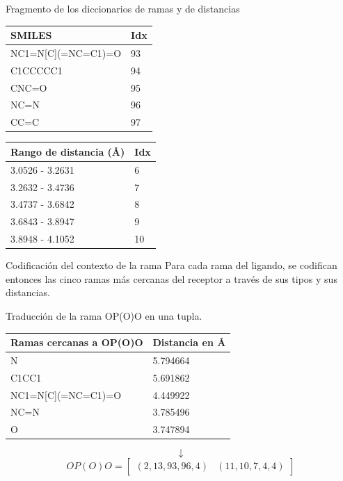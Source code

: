 \documentclass[presentation]{beamer}
\begin{document}
\begin{frame}[label={sec:orgaa8eb44}]{Fragmento de los diccionarios de ramas y de distancias}
\begin{table}[H]
  \begin{center}
    \begin{tabular}{l|l}
      SMILES                 & Idx \\ \hline
      NC1=N{[}C{]}(=NC=C1)=O & 93 \\
      C1CCCCC1               & 94 \\
      CNC=O                  & 95 \\
      NC=N                   & 96 \\
      CC=C                   & 97
    \end{tabular}
    \begin{tabular}{l|l}
      Rango de distancia (\AA) & Idx \\ \hline
      3.0526 - 3.2631        & 6   \\
      3.2632 - 3.4736        & 7   \\
      3.4737 - 3.6842        & 8   \\
      3.6843 - 3.8947        & 9   \\
      3.8948 - 4.1052        & 10
    \end{tabular}
  \end{center}
\end{table}
\end{frame}
\begin{frame}[label={sec:orgc2f7152}]{Codificación del contexto de la rama}
Para cada rama del ligando, se codifican entonces las cinco
ramas más cercanas del receptor a través de sus tipos y sus distancias.
\pause
\begin{block}{Traducción de la rama \alert{OP(O)O} en una tupla.}
\pause
\begin{table}[H]
  \begin{center}
  \begin{tabular}{l|l}
    Ramas cercanas a OP(O)O & Distancia en \AA \\ \hline N & 5.794664 \\ C1CC1 & 5.691862
    \\ NC1=N{[}C{]}(=NC=C1)=O & 4.449922 \\ NC=N & 3.785496 \\ O &
    3.747894
  \end{tabular}
  \end{center}
\end{table}
\pause
\begin{equation*}
\downarrow
\end{equation*}
\begin{equation*}
  OP(O)O=\begin{bmatrix}
  (2, 13, 93, 96, 4) & (11, 10, 7, 4, 4)
  \end{bmatrix}
\end{equation*}
\end{block}
\end{frame}
\end{document}
